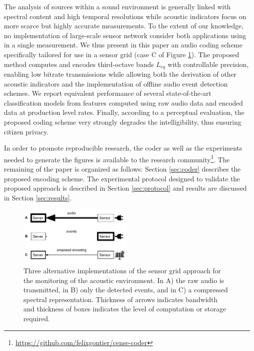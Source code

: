 \documentclass[sensors,article,submit,moreauthors,pdftex,10pt,a4paper]{mdpi}
\begin{document}
The analysis of sources within a sound environment is generally linked with spectral content \cite{ishiyama2000} and high temporal resolutions while acoustic indicators focus on more scarce but highly accurate measurements. To the extent of our knowledge, no implementation of large-scale sensor network consider both applications using in a single measurement. We thus present in this paper an audio coding scheme specifically tailored for use in a sensor grid (case C of Figure \ref{fig:codingScheme}). The proposed method computes and encodes third-octave bands $L_{eq}$ with controllable precision, enabling low bitrate transmissions while allowing both the derivation of other acoustic indicators and the implementation of offline audio event detection schemes. We report equivalent performance of several state-of-the-art classification models from features computed using raw audio data and encoded data at production level rates. Finally, according to a perceptual evaluation, the proposed coding scheme very strongly degrades the intelligibility, thus ensuring citizen privacy.

In order to promote reproducible research, the coder as well as the experiments needed to generate the figures is available to the research community\footnote{\url{https://github.com/felixgontier/cense-coder}}. The remaining of the paper is organized as follows: Section \ref{sec:coder} describes the proposed encoding scheme. The experimental protocol designed to validate the proposed approach is described in Section \ref{sec:protocol} and results are discussed in Section \ref{sec:results}.

\begin{figure}[h]
\centering
\includegraphics[width=0.5\textwidth]{figures/censeCoder}
\caption{Three alternative implementations of the sensor grid approach for the monitoring of the acoustic environment. In A) the raw audio is transmitted, in B) only the detected events, and in C) a compressed spectral representation. Thickness of arrows indicates bandwidth and thickness of boxes indicates the level of computation or storage required.}
\label{fig:codingScheme}
\end{figure}
\end{document}

